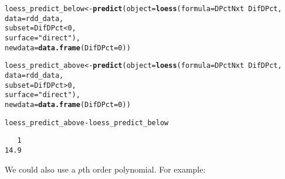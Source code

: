 \documentclass[11pt,leqno]{article}\usepackage[]{graphicx}\usepackage[]{color}
\makeatletter
\newcommand{\hlnum}[1]{\textcolor[rgb]{0.686,0.059,0.569}{#1}}%
\newcommand{\hlstr}[1]{\textcolor[rgb]{0.192,0.494,0.8}{#1}}%
\newcommand{\hlopt}[1]{\textcolor[rgb]{0,0,0}{#1}}%
\newcommand{\hlstd}[1]{\textcolor[rgb]{0.345,0.345,0.345}{#1}}%
\newcommand{\hlkwb}[1]{\textcolor[rgb]{0.69,0.353,0.396}{#1}}%
\newcommand{\hlkwc}[1]{\textcolor[rgb]{0.333,0.667,0.333}{#1}}%
\newcommand{\hlkwd}[1]{\textcolor[rgb]{0.737,0.353,0.396}{\textbf{#1}}}%
\newenvironment{kframe}{%
 \def\at@end@of@kframe{}%
 \ifinner\ifhmode%
  \def\at@end@of@kframe{\end{minipage}}%
  \begin{minipage}{\columnwidth}%
 \fi\fi%
 \def\FrameCommand##1{\hskip\@totalleftmargin \hskip-\fboxsep
 \colorbox{shadecolor}{##1}\hskip-\fboxsep
     \hskip-\linewidth \hskip-\@totalleftmargin \hskip\columnwidth}%
 \MakeFramed {\advance\hsize-\width
   \@totalleftmargin\z@ \linewidth\hsize
   \@setminipage}}%
 {\par\unskip\endMakeFramed%
 \at@end@of@kframe}
\newenvironment{knitrout}{}{} %
\theoremstyle{newstyle}
\makeatother
\begin{document}
\begin{knitrout}\footnotesize
{}\color{fgcolor}\begin{kframe}
\begin{alltt}
\hlstd{loess_predict_below} \hlkwb{<-} \hlkwd{predict}\hlstd{(}\hlkwc{object} \hlstd{=} \hlkwd{loess}\hlstd{(}\hlkwc{formula} \hlstd{= DPctNxt} \hlopt{~} \hlstd{DifDPct,}
                                                       \hlkwc{data} \hlstd{= rdd_data,}
                                                       \hlkwc{subset} \hlstd{= DifDPct} \hlopt{<} \hlnum{0}\hlstd{,}
                                                       \hlkwc{surface} \hlstd{=} \hlstr{"direct"}\hlstd{),}
                                        \hlkwc{newdata} \hlstd{=} \hlkwd{data.frame}\hlstd{(}\hlkwc{DifDPct} \hlstd{=} \hlnum{0}\hlstd{))}

\hlstd{loess_predict_above} \hlkwb{<-} \hlkwd{predict}\hlstd{(}\hlkwc{object} \hlstd{=} \hlkwd{loess}\hlstd{(}\hlkwc{formula} \hlstd{= DPctNxt} \hlopt{~} \hlstd{DifDPct,}
                                                       \hlkwc{data} \hlstd{= rdd_data,}
                                                       \hlkwc{subset} \hlstd{= DifDPct} \hlopt{>} \hlnum{0}\hlstd{,}
                                                       \hlkwc{surface} \hlstd{=} \hlstr{"direct"}\hlstd{),}
                                        \hlkwc{newdata} \hlstd{=} \hlkwd{data.frame}\hlstd{(}\hlkwc{DifDPct} \hlstd{=} \hlnum{0}\hlstd{))}

\hlstd{loess_predict_above} \hlopt{-} \hlstd{loess_predict_below}
\end{alltt}
\begin{verbatim}
   1 
14.9 
\end{verbatim}
\end{kframe}
\end{knitrout}

We could also use a $p$th order polynomial. For example:
\end{document}
